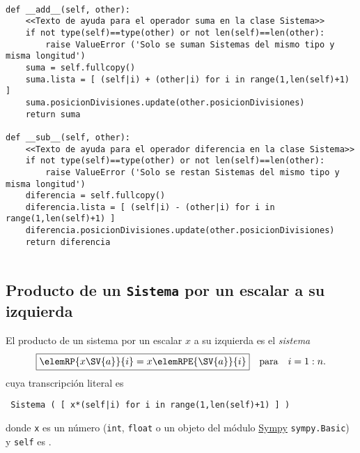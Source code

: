 \documentclass[11pt]{report}
\begin{document}
\begin{verbatim}

def __add__(self, other):
    <<Texto de ayuda para el operador suma en la clase Sistema>>
    if not type(self)==type(other) or not len(self)==len(other):
        raise ValueError ('Solo se suman Sistemas del mismo tipo y misma longitud')
    suma = self.fullcopy()
    suma.lista = [ (self|i) + (other|i) for i in range(1,len(self)+1) ]
    suma.posicionDivisiones.update(other.posicionDivisiones)
    return suma
            
def __sub__(self, other):
    <<Texto de ayuda para el operador diferencia en la clase Sistema>>
    if not type(self)==type(other) or not len(self)==len(other):
        raise ValueError ('Solo se restan Sistemas del mismo tipo y misma longitud')
    diferencia = self.fullcopy()
    diferencia.lista = [ (self|i) - (other|i) for i in range(1,len(self)+1) ]
    diferencia.posicionDivisiones.update(other.posicionDivisiones)
    return diferencia
            
\end{verbatim}

\subsection{Producto de un \texttt{Sistema} por un escalar a su izquierda}
\label{sec:org128a365}

El producto de un sistema  por un escalar \(x\) a su izquierda es
el \emph{sistema}
\begin{displaymath}
  \fbox{\begin{math} 
      \elemRP{x\SV{a}}{i}=x \elemRPE{\SV{a}}{i}
  \end{math}}\quad\text{para}\quad i=1:n.
\end{displaymath}
cuya transcripción literal es
\begin{center}
  \Verb/ Sistema ( [ x*(self|i) for i in range(1,len(self)+1) ] ) /
\end{center}

donde \texttt{x} es un número (\texttt{int}, \texttt{float} o un objeto del módulo \href{https://docs.sympy.org/latest/index.html}{Sympy}
\texttt{sympy.Basic}) y \texttt{self} es .
\end{document}
